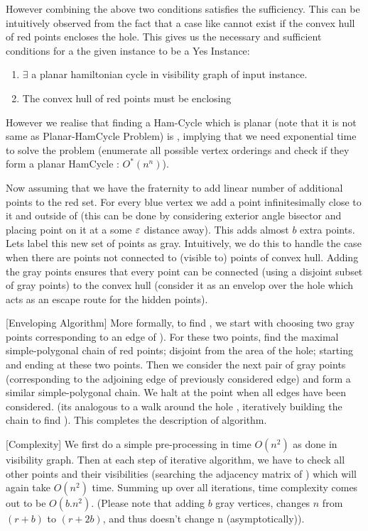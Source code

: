 However combining the above two conditions satisfies the sufficiency. This can be intuitively observed from the fact that a case like  cannot exist if the convex hull of red points encloses the hole. This gives us the necessary and sufficient conditions for a the given \ph instance to be a Yes Instance:
\begin{enumerate}
	\item $\exists$ a planar hamiltonian cycle in visibility graph \GG of input instance.
	\item The convex hull of red points must be enclosing \HH
\end{enumerate}

However we realise that finding a Ham-Cycle which is planar (note that it is not same as Planar-HamCycle Problem) is \NPH, implying that we need exponential time to solve the problem (enumerate all possible vertex orderings and check if they form a planar HamCycle : $O^*(n^n)$).

Now assuming that we have the fraternity to add linear number of additional points to the red set. For every blue vertex we add a point infinitesimally close to it and outside of \HH (this can be done by considering exterior angle bisector and placing point on it at a some $\varepsilon$ distance away). This adds almost $b$ extra points. Lets label this new set of points as gray. Intuitively, we do this to handle the case when there are points not connected to (visible to) points of convex hull. Adding the gray points ensures that every point can be connected (using a disjoint subset of gray points) to the convex hull (consider it as an envelop over the hole which acts as an escape route for the hidden points). 

[Enveloping Algorithm] More formally, to find \PP, we start with choosing two gray points corresponding to an edge of \HH). For these two points, find the maximal simple-polygonal chain of red points; disjoint from the area of the hole; starting and ending at these two points. Then we consider the next pair of gray points (corresponding to the adjoining edge of previously considered edge) and form a similar simple-polygonal chain. We halt at the point when all edges have been considered. (its analogous to a walk around the hole \HH, iteratively building the chain to find \PP). This completes the description of algorithm. 

[Complexity] We first do a simple pre-processing in time $O(n^2)$ as done in visibility graph. Then at each step of iterative algorithm, we have to check all other points and their visibilities (searching the adjacency matrix of \GG) which will again take $O(n^2)$ time. Summing up over all iterations, time complexity comes out to be $O(b.n^2)$. (Please note that adding $b$ gray vertices, changes $n$ from $(r+b)$ to $(r+2b)$, and thus doesn't change n (asymptotically)).


